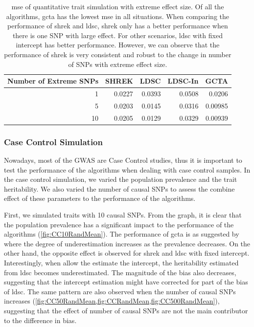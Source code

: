 		\begin{table}
			\centering
			\begin{tabular}{rrrrr}
				\toprule
				Number of Extreme SNPs&	SHREK&	LDSC&	LDSC-In&	GCTA \\
				\midrule
				1	&	0.0227	&	0.0393	&	0.0508	&	0.0206\\
				5	&	0.0203	&	0.0145	&	0.0316	&	0.00985\\
				10	&	0.0205	&	0.0129	&	0.0329	&	0.00939\\
				\bottomrule
			\end{tabular}
			\caption[MSE of Quantitative Trait Simulation with Extreme Effect Size]{
				\gls{mse} of quantitative trait simulation with extreme effect size.
				Of all the algorithms, \gls{gcta} has the lowest \gls{mse} in all situations.
				When comparing the performance of \gls{shrek} and \gls{ldsc}, \gls{shrek} only has a better performance when there is one \gls{SNP} with large effect. 
				For other scenarios, \gls{ldsc} with fixed intercept has better performance.
				However, we can observe that the performance of \gls{shrek} is very consistent and robust to the change in number of \glspl{SNP} with extreme effect size.
				}
			\label{tab:mseEx100c}
		\end{table}
		
		\subsubsection{Case Control Simulation}
		
		Nowadays, most of the \gls{GWAS} are Case Control studies, thus it is important to test the performance of the algorithms when dealing with case control samples. 
		In the case control simulation, we varied the population prevalence and the trait heritability. 
		We also varied the number of causal \glspl{SNP} to assess the combine effect of these parameters to the performance of the algorithms.
		
		First, we simulated traits with 10 causal \glspl{SNP}.
		From the graph, it is clear that the population prevalence has a significant impact to the performance of the algorithms (\cref{fig:CC10RandMean}). 
		The performance of \gls{gcta} is as suggested by \citet{Golan2014} where the degree of underestimation increases as the prevalence decreases.
		On the other hand, the opposite effect is observed for \gls{shrek} and \gls{ldsc} with fixed intercept.
		Interestingly, when allow the estimate the intercept, the heritability estimated from \gls{ldsc} becomes underestimated. 
		The magnitude of the bias also decreases, suggesting that the intercept estimation might have corrected for part of the bias of \gls{ldsc}.
		The same pattern are also observed when the number of causal \glspl{SNP} increases (\cref{fig:CC50RandMean,fig:CCRandMean,fig:CC500RandMean}), suggesting that the effect of number of causal \glspl{SNP} are not the main contributor to the difference in bias. 
		

